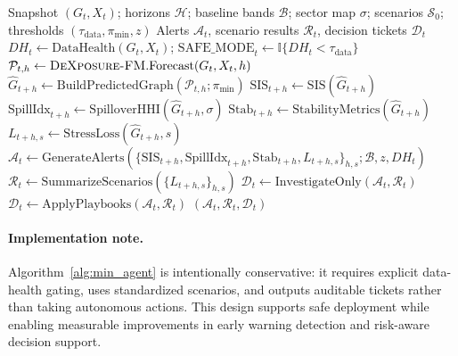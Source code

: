 \begin{algorithm}[t]
\caption{Minimal Viable \textsc{DeXposure-FM} Agent (Monitoring + Decision v1)}
\label{alg:min_agent}
\begin{algorithmic}[1]
\Require Snapshot $(G_t,X_t)$; horizons $\mathcal{H}$; baseline bands $\mathcal{B}$; sector map $\sigma$; scenarios $\mathcal{S}_0$; thresholds $(\tau_{\mathrm{data}},\pi_{\min},z)$
\Ensure Alerts $\mathcal{A}_t$, scenario results $\mathcal{R}_t$, decision tickets $\mathcal{D}_t$
\State $DH_t \gets \mathrm{DataHealth}(G_t,X_t)$; $\mathrm{SAFE\_MODE}_t \gets \mathbb{I}\{DH_t < \tau_{\mathrm{data}}\}$
    \State $\mathcal{P}_{t,h} \gets \textsc{DeXposure-FM}.\mathrm{Forecast}(G_t,X_t,h)$
    \State $\widehat{G}_{t+h} \gets \mathrm{BuildPredictedGraph}(\mathcal{P}_{t,h};\pi_{\min})$ 
    \State $\mathrm{SIS}_{t+h} \gets \mathrm{SIS}(\widehat{G}_{t+h})$
    \State $\mathrm{SpillIdx}_{t+h} \gets \mathrm{SpilloverHHI}(\widehat{G}_{t+h},\sigma)$ 
    \State $\mathrm{Stab}_{t+h} \gets \mathrm{StabilityMetrics}(\widehat{G}_{t+h})$
        \State $L_{t+h,s} \gets \mathrm{StressLoss}(\widehat{G}_{t+h}, s)$
    \EndFor
\EndFor
\State $\mathcal{A}_t \gets \mathrm{GenerateAlerts}(\{\mathrm{SIS}_{t+h},\mathrm{SpillIdx}_{t+h},\mathrm{Stab}_{t+h},L_{t+h,s}\}_{h,s}; \mathcal{B}, z, DH_t)$
\State $\mathcal{R}_t \gets \mathrm{SummarizeScenarios}(\{L_{t+h,s}\}_{h,s})$ 
    \State $\mathcal{D}_t \gets \mathrm{InvestigateOnly}(\mathcal{A}_t,\mathcal{R}_t)$
\Else
    \State $\mathcal{D}_t \gets \mathrm{ApplyPlaybooks}(\mathcal{A}_t,\mathcal{R}_t)$
\EndIf
\State \Return $(\mathcal{A}_t,\mathcal{R}_t,\mathcal{D}_t)$
\end{algorithmic}
\end{algorithm}

\paragraph{Implementation note.}
Algorithm~\ref{alg:min_agent} is intentionally conservative: it requires explicit data-health gating, uses standardized scenarios, and outputs auditable tickets rather than taking autonomous actions. This design supports safe deployment while enabling measurable improvements in early warning detection and risk-aware decision support.